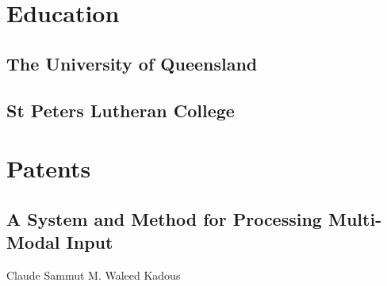 \documentclass[a4paper]{awesome-deedy}
\begin{document}
\begin{minipage}[t]{0.33\textwidth} 


\section{Education} 

\subsection{The University of \newline Queensland}
\sectionsep

\subsection{St Peters Lutheran College}
\sectionsep


\section{Patents} 

\subsection{A System and Method for \newline Processing Multi-Modal \newline Input}
\begin{center}
Claude Sammut \textbullet{} M. Waleed Kadous
\end{center}
\sectionsep




\end{minipage}
\end{document}
